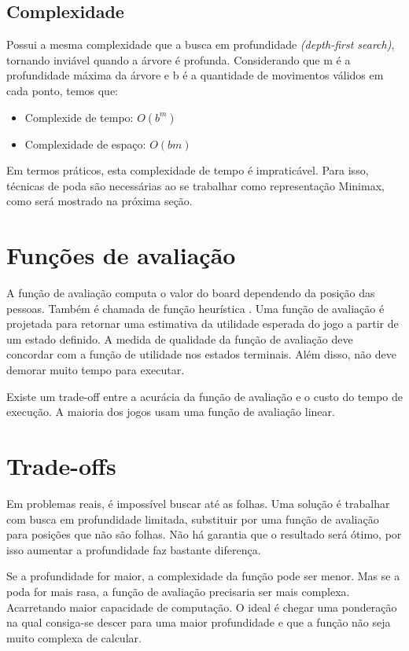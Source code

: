 \documentclass[sigplan,screen]{acmart}
\begin{document}
\subsection{Complexidade}

Possui a mesma complexidade que a busca em profundidade {\itshape (depth-first search)}, tornando inviável quando a árvore é profunda.
Considerando que m é a profundidade máxima da árvore e b é a quantidade de movimentos válidos em cada ponto, temos que:
\begin{itemize}
  \item Complexide de tempo: $O(b^m)$
  \item Complexidade de espaço: $O(bm)$
\end{itemize}

Em termos práticos, esta complexidade de tempo é impraticável. Para isso, técnicas de poda são necessárias ao se trabalhar como representação Minimax, como será mostrado na próxima seção.

\section{Funções de avaliação}

A função de avaliação computa o valor do board dependendo da posição das pessoas. Também é chamada de função heurística \cite{Aradhya02}. 
Uma função de avaliação é projetada para retornar uma estimativa da utilidade esperada do jogo a partir de um estado definido. 
A medida de qualidade da função de avaliação deve concordar com a função de utilidade nos estados terminais. Além disso, não deve demorar muito tempo para executar.

Existe um trade-off entre a acurácia da função de avaliação e o custo do tempo de execução. 
A maioria dos jogos usam uma função de avaliação linear.


\section{Trade-offs}

Em problemas reais, é impossível buscar até as folhas. 
Uma solução é trabalhar com busca em profundidade limitada, substituir por uma função de avaliação para posições que não são folhas.
Não há garantia que o resultado será ótimo, por isso aumentar a profundidade faz bastante diferença.

Se a profundidade for maior, a complexidade da função pode ser menor. Mas se a poda for mais rasa, a função de avaliação precisaria ser mais complexa. 
Acarretando maior capacidade de computação. 
O ideal é chegar uma ponderação na qual consiga-se descer para uma maior profundidade e que a função não seja muito complexa de calcular.
\end{document}
